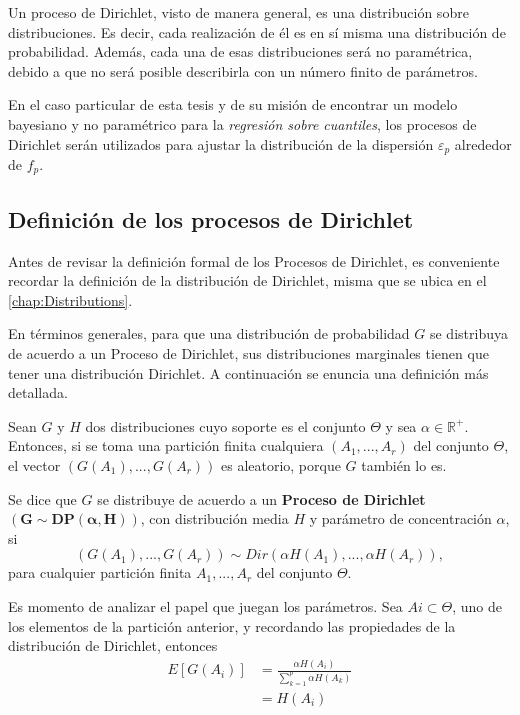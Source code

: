 Un proceso de Dirichlet, visto de manera general, es una distribuci\'on sobre distribuciones. Es decir, cada realizaci\'on de él es en sí misma una distribuci\'on de probabilidad. Adem\'as, cada una de esas distribuciones ser\'a no param\'etrica, debido a que no ser\'a posible describirla con un n\'umero finito de par\'ametros.

En el caso particular de esta tesis y de su misi\'on de encontrar un modelo bayesiano y no param\'etrico para la \textit{regresi\'on sobre cuantiles}, los procesos de Dirichlet ser\'an utilizados para ajustar la distribuci\'on de la dispersi\'on $\varepsilon_p$ alrededor de $f_p$.

\subsection{Definici\'on de los procesos de Dirichlet}

Antes de revisar la definici\'on formal de los Procesos de Dirichlet, es conveniente recordar la definici\'on de la distribuci\'on de Dirichlet, misma que se ubica en el \autoref{chap:Distributions}.

En t\'erminos generales, para que una distribuci\'on de probabilidad $G$ se distribuya de acuerdo a un Proceso de Dirichlet, sus distribuciones marginales tienen que tener una distribuci\'on Dirichlet. A continuaci\'on se enuncia una definici\'on m\'as detallada.

\begin{defin}
    Sean $G$ y $H$ dos distribuciones cuyo soporte es el conjunto $\Theta$ y sea $\alpha \in \mathbb{R}^+$. Entonces, si se toma una partici\'on finita cualquiera $(A_1,...,A_r)$ del conjunto $\Theta$, el vector $(G(A_1),...,G(A_r))$ es aleatorio, porque $G$ tambi\'en lo es.
    
    Se dice que $G$ se distribuye de acuerdo a un \textbf{Proceso de Dirichlet} $\bm{(G \sim DP(\alpha,H))}$, con distribuci\'on media $H$ y par\'ametro de concentraci\'on $\alpha$, si
    \begin{equation*}
        (G(A_1),...,G(A_r)) \sim Dir(\alpha H(A_1),...,\alpha H(A_r)), 
    \end{equation*}
    para cualquier partici\'on finita $A_1,...,A_r$ del conjunto $\Theta$.
\end{defin}

Es momento de analizar el papel que juegan los par\'ametros. Sea $Ai \subset \Theta$, uno de los elementos de la partici\'on anterior, y recordando las propiedades de la distribuci\'on de Dirichlet, entonces
\begin{equation*}
\begin{aligned}
    E[G(A_i)] 
    &= \frac{\alpha H(A_i)}{\sum_{k=1}^p \alpha H(A_k)} \\
    &= H(A_i) \\
\end{aligned}
\end{equation*}

